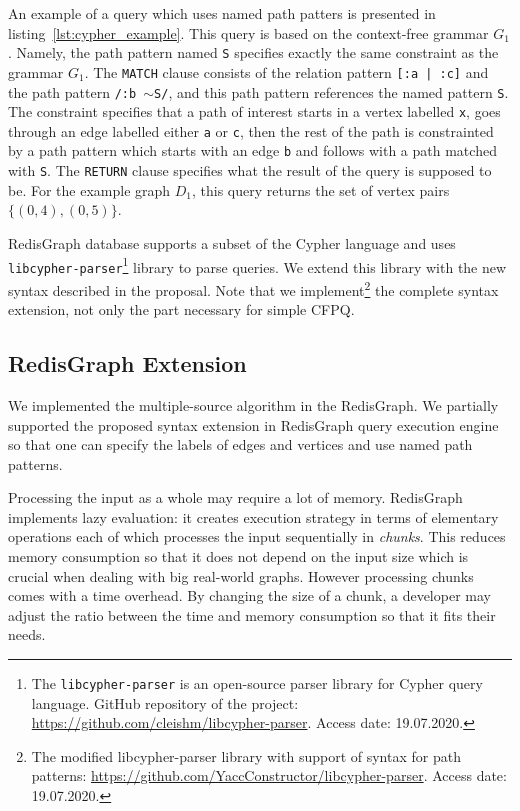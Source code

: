 An example of a query which uses named path patters is presented in listing~\ref{lst:cypher_example}.
This query is based on the context-free grammar $G_1$.
Namely, the path pattern named \texttt{S} specifies exactly the same constraint as the grammar $G_1$.
The \texttt{MATCH} clause consists of the relation pattern \texttt{[:a | :c]} and the path pattern \texttt{/:b $\sim$S/}, and this path pattern references the named pattern \texttt{S}.
The constraint specifies that a path of interest starts in a vertex labelled \texttt{x}, goes through an edge labelled either \texttt{a} or \texttt{c}, then the rest of the path is constrainted by a path pattern which starts with an edge \texttt{b} and follows with a path matched with \texttt{S}.
The \texttt{RETURN} clause specifies what the result of the query is supposed to be.
For the example graph $D_1$, this query returns the set of vertex pairs $\{(0, 4), (0, 5)\}$.

RedisGraph database supports a subset of the Cypher language and uses \texttt{libcypher-parser}\footnote{The \texttt{libcypher-parser} is an open-source parser library for Cypher query language. GitHub repository of the project: \url{https://github.com/cleishm/libcypher-parser}. Access date: 19.07.2020.} library to parse queries.
We extend this library with the new syntax described in the proposal.
Note that we implement\footnote{The modified libcypher-parser library with support of syntax for path patterns: \url{https://github.com/YaccConstructor/libcypher-parser}. Access date: 19.07.2020.} the complete syntax extension, not only the part necessary for simple CFPQ.

\subsection{RedisGraph Extension}

We implemented the multiple-source algorithm in the RedisGraph.
We partially supported the proposed syntax extension in RedisGraph query execution engine so that one can specify the labels of edges and vertices and use named path patterns.

Processing the input as a whole may require a lot of memory.
RedisGraph implements lazy evaluation: it creates execution strategy in terms of elementary operations each of which processes the input sequentially in \emph{chunks}.
This reduces memory consumption so that it does not depend on the input size which is crucial when dealing with big real-world graphs.
However processing chunks comes with a time overhead.
By changing the size of a chunk, a developer may adjust the ratio between the time and memory consumption so that it fits their needs.

